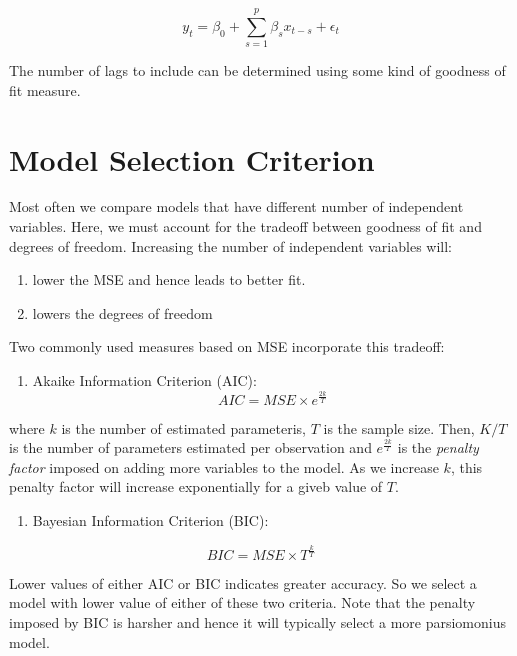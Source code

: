 \documentclass[]{book}
\providecommand{\tightlist}{%
  \setlength{\itemsep}{0pt}\setlength{\parskip}{0pt}}
\theoremstyle{definition}
\theoremstyle{definition}
\theoremstyle{definition}
\theoremstyle{remark}
\begin{document}
\begin{equation}
y_t= \beta_0 +\sum_{s=1}^p\beta_s x_{t-s} + \epsilon_t
\end{equation}

The number of lags to include can be determined using some kind of
goodness of fit measure.

\section{Model Selection Criterion}\label{model-selection-criterion}

Most often we compare models that have different number of independent
variables. Here, we must account for the tradeoff between goodness of
fit and degrees of freedom. Increasing the number of independent
variables will:

\begin{enumerate}
\def\labelenumi{\arabic{enumi}.}
\item
  lower the MSE and hence leads to better fit.
\item
  lowers the degrees of freedom
\end{enumerate}

Two commonly used measures based on MSE incorporate this tradeoff:

\begin{enumerate}
\def\labelenumi{\arabic{enumi}.}
\tightlist
\item
  Akaike Information Criterion (AIC):
  \[ AIC= MSE \times e^{\frac{2k}{T}} \]
\end{enumerate}

where \(k\) is the number of estimated parameteris, \(T\) is the sample
size. Then, \(K/T\) is the number of parameters estimated per
observation and \(e^{\frac{2k}{T}}\) is the \emph{penalty factor}
imposed on adding more variables to the model. As we increase \(k\),
this penalty factor will increase exponentially for a giveb value of
\(T\).

\begin{enumerate}
\def\labelenumi{\arabic{enumi}.}
\setcounter{enumi}{1}
\tightlist
\item
  Bayesian Information Criterion (BIC):
\end{enumerate}

\[ BIC= MSE \times T^{\frac{k}{T}} \]

Lower values of either AIC or BIC indicates greater accuracy. So we
select a model with lower value of either of these two criteria. Note
that the penalty imposed by BIC is harsher and hence it will typically
select a more parsiomonius model.
\end{document}
